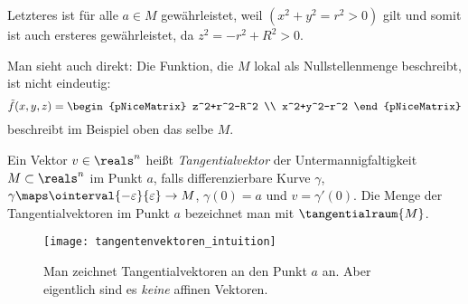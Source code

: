 \begin{beispiele*}
\begin{enumerate}
\begin{beispiel*}
      Letzteres ist für alle \( a\in M \) gewährleistet, weil \( (x^2+y^2=r^2>0) \) gilt und somit ist auch ersteres gewährleistet, da \( z^2=-r^2+R^2>0 \).

      Man sieht auch direkt: Die Funktion, die \( M \) lokal als Nullstellenmenge beschreibt, ist nicht eindeutig: \zb
      \begin{equation*}
        \tilde{f}(x,y,z)=\begin{pNiceMatrix} z^2+r^2-R^2 \\ x^2+y^2-r^2 \end{pNiceMatrix}
      \end{equation*}
      beschreibt im Beispiel oben das selbe \( M \).
    \end{beispiel*}
  \end{enumerate}
\end{beispiele*}
\begin{definition}\label{tangentialraum}
  Ein Vektor \( v\in \reals^n \) heißt \emph{Tangentialvektor} der Untermannigfaltigkeit \( M\subset \reals^n \) im Punkt \( a \), falls \texists differenzierbare Kurve \( \gamma \), \( \gamma\maps \ointerval{-\varepsilon}{\varepsilon} \to M\), \sd \( \gamma(0)=a \) und \( v=\gamma'(0) \). Die Menge der Tangentialvektoren im Punkt \( a \) bezeichnet man mit \( \tangentialraum{M} \). 
  \begin{figure}[H]
    \centering
    \texttt{[image: tangentenvektoren\_intuition]}
    \caption*{Man zeichnet Tangentialvektoren an den Punkt \( a \) an. Aber eigentlich sind es \emph{keine} affinen Vektoren.}
    \label{fig:tangentenvektoren_intuition}
  \end{figure}
\end{definition}
